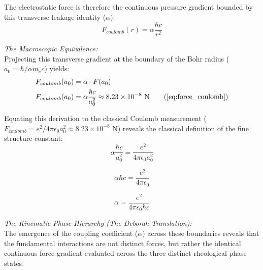 The electrostatic force is therefore the continuous pressure gradient bounded by this transverse leakage identity ($\alpha$):
\begin{equation}
    F_{coulomb}(r) = \alpha \frac{\hbar c}{r^2}
\end{equation}

\vspace{0.2 cm}
\textit{The Macroscopic Equivalence:} \\
Projecting this transverse gradient at the boundary of the Bohr radius ($a_0 = \hbar / \alpha m_e c$) yields:
\begin{align}
    F_{coulomb}(a_0) &= \alpha \cdot F(a_0) \nonumber \\
    F_{coulomb}(a_0) &= \alpha \frac{\hbar c}{a_0^2} \approx 8.23 \times 10^{-8} \text{ N} \tag{\ref{eq:force_coulomb}}
\end{align}

Equating this derivation to the classical Coulomb measurement ($F_{coulomb} = e^2 / 4\pi \epsilon_0 a_0^2 \approx 8.23 \times 10^{-8} \text{ N}$) reveals the classical definition of the fine structure constant:
\begin{equation}
    \alpha \frac{\hbar c}{a_0^2} = \frac{e^2}{4\pi \epsilon_0 a_0^2} \nonumber
\end{equation}

\begin{equation}
    \alpha \hbar c = \frac{e^2}{4\pi \epsilon_0} \nonumber
\end{equation}

\begin{equation}
    \alpha = \frac{e^2}{4\pi \epsilon_0 \hbar c} \label{eq:alpha_empirical_recovery}
\end{equation}

\vspace{0.2 cm}
\textit{The Kinematic Phase Hierarchy (The Deborah Translation):} \\
The emergence of the coupling coefficient ($\alpha$) across these boundaries reveals that the fundamental interactions are not distinct forces, but rather the identical continuous force gradient evaluated across the three distinct rheological phase states. 

